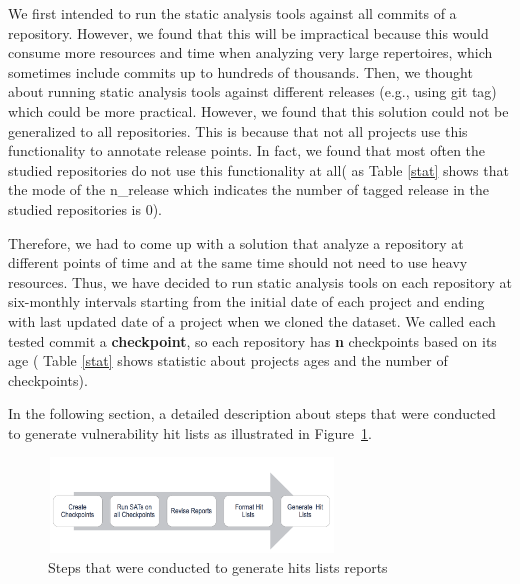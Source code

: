 We first intended to run the static analysis tools against all commits of a repository. However, we found that this will be impractical because this would consume more resources and time when analyzing very large repertoires, which sometimes include commits up to hundreds of thousands. Then, we thought about running static analysis tools against different releases (e.g., using git tag) which could be more practical. However, we found that this solution could not be generalized to all repositories. This is because that not all projects use this functionality to annotate release points. In fact, we found that most often the studied repositories do not use this functionality at all( as Table \ref{stat} shows that the mode of the n\_release which indicates the number of tagged release in the studied repositories is 0). 

Therefore, we had to come up with a solution that analyze a repository at different points of time and at the same time should not need to use heavy resources.  Thus, we have decided to run static analysis tools on each repository at six-monthly intervals starting from the initial date of each project and ending with last updated date of a project when we cloned the dataset.  We called each tested commit a \textbf{checkpoint}, so each repository has \textbf{n} checkpoints based on its age ( Table \ref{stat} shows statistic about  projects ages  and the number of checkpoints).


In the following section, a detailed description about steps that were conducted to generate vulnerability hit lists as illustrated in Figure~\ref{cyc}. 

\begin{figure} [h!]
\centering
\includegraphics[height=1in, width=3in]{hit.png}
\caption{Steps that were conducted to generate hits lists reports}
\label{cyc}
\end{figure}

